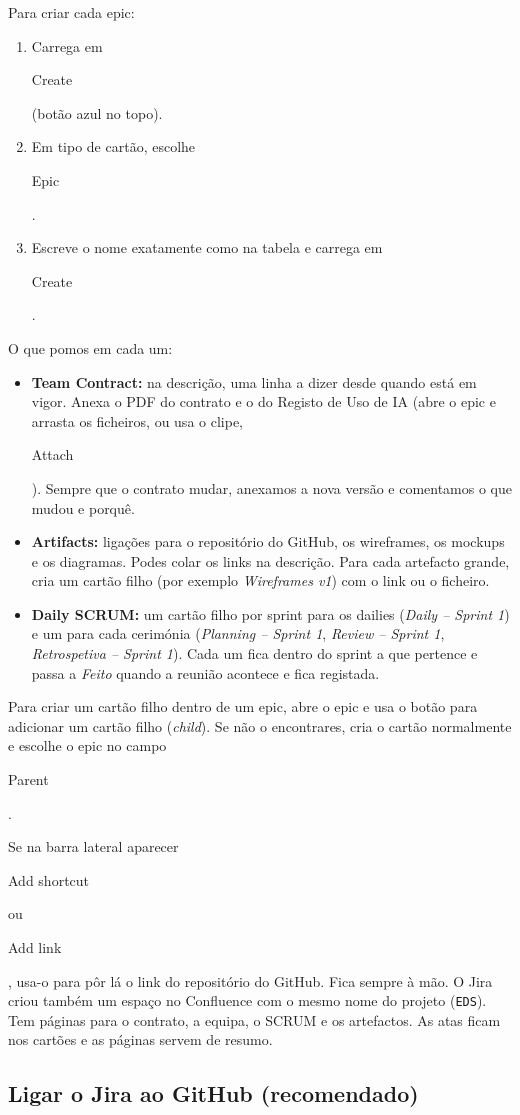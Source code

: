 \documentclass[11pt,a4paper]{article}
\newcommand{\btn}[1]{{\setlength{\fboxsep}{1.6pt}\colorbox{azulclaro}{\sffamily\small\strut #1}}}
\begin{document}
Para criar cada epic:

\begin{enumerate}
  \item Carrega em \btn{Create} (botão azul no topo).
  \item Em tipo de cartão, escolhe \btn{Epic}.
  \item Escreve o nome exatamente como na tabela e carrega em \btn{Create}.
\end{enumerate}

O que pomos em cada um:

\begin{itemize}
  \item \textbf{Team Contract:} na descrição, uma linha a dizer desde quando está em vigor. Anexa o PDF do contrato e o do Registo de Uso de IA (abre o epic e arrasta os ficheiros, ou usa o clipe, \btn{Attach}). Sempre que o contrato mudar, anexamos a nova versão e comentamos o que mudou e porquê.
  \item \textbf{Artifacts:} ligações para o repositório do GitHub, os wireframes, os mockups e os diagramas. Podes colar os links na descrição. Para cada artefacto grande, cria um cartão filho (por exemplo \textit{Wireframes v1}) com o link ou o ficheiro.
  \item \textbf{Daily SCRUM:} um cartão filho por sprint para os dailies (\textit{Daily – Sprint 1}) e um para cada cerimónia (\textit{Planning – Sprint 1}, \textit{Review – Sprint 1}, \textit{Retrospetiva – Sprint 1}). Cada um fica dentro do sprint a que pertence e passa a \textit{Feito} quando a reunião acontece e fica registada.
\end{itemize}

Para criar um cartão filho dentro de um epic, abre o epic e usa o botão para adicionar um cartão filho (\textit{child}). Se não o encontrares, cria o cartão normalmente e escolhe o epic no campo \btn{Parent}.

\begin{tcolorbox}[dica, title={Dica: links úteis na barra lateral}]
  Se na barra lateral aparecer \btn{Add shortcut} ou \btn{Add link}, usa-o para pôr lá o link do repositório do GitHub. Fica sempre à mão. O Jira criou também um espaço no Confluence com o mesmo nome do projeto (\texttt{EDS}). Tem páginas para o contrato, a equipa, o SCRUM e os artefactos. As atas ficam nos cartões e as páginas servem de resumo.
\end{tcolorbox}

\subsection{Ligar o Jira ao GitHub (recomendado)}
\end{document}
